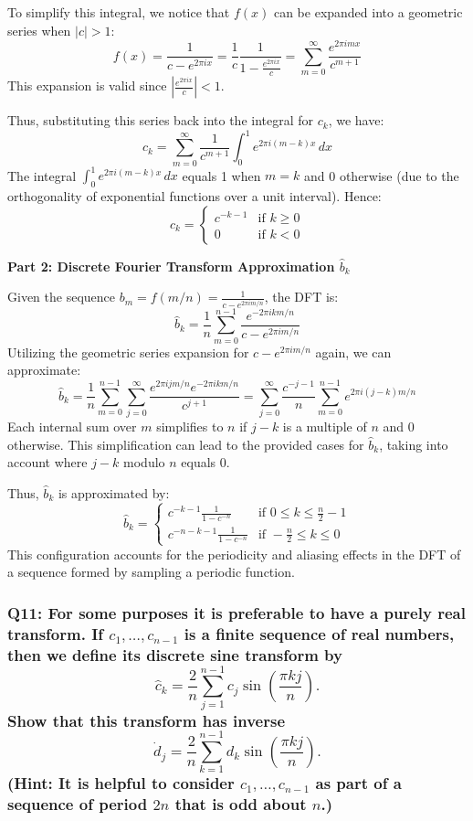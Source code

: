 \documentclass[8pt]{article}
\begin{document}
{To simplify this integral, we notice that \(f(x)\) can be expanded into a geometric series when \(|c| > 1\):
\[
f(x) = \frac{1}{c - e^{2\pi ix}} = \frac{1}{c} \frac{1}{1 - \frac{e^{2\pi ix}}{c}} = \sum_{m=0}^\infty \frac{e^{2\pi i mx}}{c^{m+1}}
\]
This expansion is valid since \( \left|\frac{e^{2\pi ix}}{c}\right| < 1 \).

Thus, substituting this series back into the integral for \(c_k\), we have:
\[
c_k = \sum_{m=0}^\infty \frac{1}{c^{m+1}} \int_0^1 e^{2\pi i (m-k) x} \, dx
\]
The integral \(\int_0^1 e^{2\pi i (m-k) x} \, dx\) equals 1 when \(m = k\) and 0 otherwise (due to the orthogonality of exponential functions over a unit interval). Hence:
\[
c_k = \begin{cases}
c^{-k-1} & \text{if } k \geq 0 \\
0 & \text{if } k < 0
\end{cases}
\]

\textbf{Part 2: Discrete Fourier Transform Approximation \(\hat{b}_k\)}

Given the sequence \(b_m = f(m/n) = \frac{1}{c - e^{2\pi i m/n}}\), the DFT is:
\[
\hat{b}_k = \frac{1}{n} \sum_{m=0}^{n-1} \frac{e^{-2\pi i k m/n}}{c - e^{2\pi i m/n}}
\]
Utilizing the geometric series expansion for \(c - e^{2\pi i m/n}\) again, we can approximate:
\[
\hat{b}_k = \frac{1}{n} \sum_{m=0}^{n-1} \sum_{j=0}^\infty \frac{e^{2\pi i j m/n} e^{-2\pi i k m/n}}{c^{j+1}} = \sum_{j=0}^\infty \frac{c^{-j-1}}{n} \sum_{m=0}^{n-1} e^{2\pi i (j-k) m/n}
\]
Each internal sum over \(m\) simplifies to \(n\) if \(j-k\) is a multiple of \(n\) and 0 otherwise. This simplification can lead to the provided cases for \(\hat{b}_k\), taking into account where \(j-k\) modulo \(n\) equals 0.

Thus, \(\hat{b}_k\) is approximated by:
\[
\hat{b}_k = \begin{cases}
c^{-k-1} \frac{1}{1 - c^{-n}} & \text{if } 0 \leq k \leq \frac{n}{2} - 1 \\
c^{-n-k-1} \frac{1}{1 - c^{-n}} & \text{if } -\frac{n}{2} \leq k \leq 0
\end{cases}
\]
This configuration accounts for the periodicity and aliasing effects in the DFT of a sequence formed by sampling a periodic function.

\subsubsection*{Q11:
For some purposes it is preferable to have a purely real transform. If \(c_1, \ldots, c_{n-1}\) is a finite sequence of real numbers, then we define its discrete sine transform by
\[
\hat{c}_k = \frac{2}{n} \sum_{j=1}^{n-1} c_j \sin \left( \frac{\pi kj}{n} \right).
\]
Show that this transform has inverse
\[
\dot{d}_j = \frac{2}{n} \sum_{k=1}^{n-1} d_k \sin \left( \frac{\pi kj}{n} \right).
\]
(Hint: It is helpful to consider \(c_1, \ldots, c_{n-1}\) as part of a sequence of period \(2n\) that is odd about \(n\).)}

}
\end{document}
